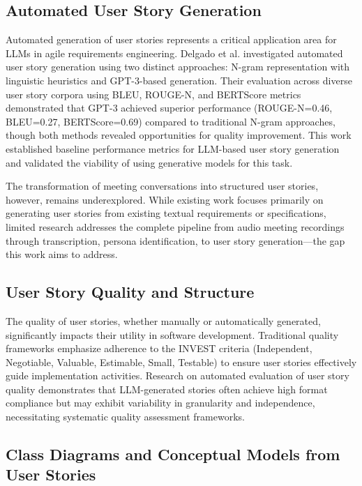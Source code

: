 \documentclass[12pt]{article}
\begin{document}
\subsection{Automated User Story Generation}

Automated generation of user stories represents a critical application area for LLMs in agile requirements engineering. Delgado et al. \cite{delgado2024aidriven} investigated automated user story generation using two distinct approaches: N-gram representation with linguistic heuristics and GPT-3-based generation. Their evaluation across diverse user story corpora using BLEU, ROUGE-N, and BERTScore metrics demonstrated that GPT-3 achieved superior performance (ROUGE-N=0.46, BLEU=0.27, BERTScore=0.69) compared to traditional N-gram approaches, though both methods revealed opportunities for quality improvement. This work established baseline performance metrics for LLM-based user story generation and validated the viability of using generative models for this task.

The transformation of meeting conversations into structured user stories, however, remains underexplored. While existing work focuses primarily on generating user stories from existing textual requirements or specifications, limited research addresses the complete pipeline from audio meeting recordings through transcription, persona identification, to user story generation—the gap this work aims to address.

\subsection{User Story Quality and Structure}

The quality of user stories, whether manually or automatically generated, significantly impacts their utility in software development. Traditional quality frameworks emphasize adherence to the INVEST criteria (Independent, Negotiable, Valuable, Estimable, Small, Testable) to ensure user stories effectively guide implementation activities. Research on automated evaluation of user story quality demonstrates that LLM-generated stories often achieve high format compliance but may exhibit variability in granularity and independence, necessitating systematic quality assessment frameworks.

\subsection{Class Diagrams and Conceptual Models from User Stories}
\end{document}

